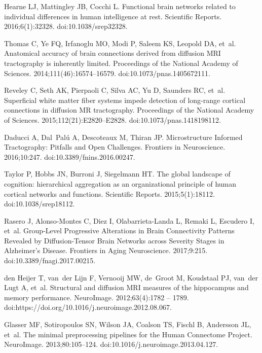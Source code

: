 \documentclass[10pt,letterpaper]{article}
\begin{document}
\begin{thebibliography}{10}
Hearne LJ, Mattingley JB, Cocchi L.
\newblock Functional brain networks related to individual differences in human
  intelligence at rest.
\newblock Scientific Reports. 2016;6(1):32328.
\newblock doi:{10.1038/srep32328}.

Thomas C, Ye FQ, Irfanoglu MO, Modi P, Saleem KS, Leopold DA, et~al.
\newblock Anatomical accuracy of brain connections derived from diffusion MRI
  tractography is inherently limited.
\newblock Proceedings of the National Academy of Sciences.
  2014;111(46):16574--16579.
\newblock doi:{10.1073/pnas.1405672111}.

Reveley C, Seth AK, Pierpaoli C, Silva AC, Yu D, Saunders RC, et~al.
\newblock Superficial white matter fiber systems impede detection of long-range
  cortical connections in diffusion MR tractography.
\newblock Proceedings of the National Academy of Sciences.
  2015;112(21):E2820--E2828.
\newblock doi:{10.1073/pnas.1418198112}.

Daducci A, Dal~Palú A, Descoteaux M, Thiran JP.
\newblock Microstructure Informed Tractography: Pitfalls and Open Challenges.
\newblock Frontiers in Neuroscience. 2016;10:247.
\newblock doi:{10.3389/fnins.2016.00247}.

Taylor P, Hobbs JN, Burroni J, Siegelmann HT.
\newblock The global landscape of cognition: hierarchical aggregation as an
  organizational principle of human cortical networks and functions.
\newblock Scientific Reports. 2015;5(1):18112.
\newblock doi:{10.1038/srep18112}.

Rasero J, Alonso-Montes C, Diez I, Olabarrieta-Landa L, Remaki L, Escudero I,
  et~al.
\newblock Group-Level Progressive Alterations in Brain Connectivity Patterns
  Revealed by Diffusion-Tensor Brain Networks across Severity Stages in
  Alzheimer’s Disease.
\newblock Frontiers in Aging Neuroscience. 2017;9:215.
\newblock doi:{10.3389/fnagi.2017.00215}.

den Heijer T, van~der Lijn F, Vernooij MW, de~Groot M, Koudstaal PJ, van~der
  Lugt A, et~al.
\newblock Structural and diffusion MRI measures of the hippocampus and memory
  performance.
\newblock NeuroImage. 2012;63(4):1782 -- 1789.
\newblock doi:{https://doi.org/10.1016/j.neuroimage.2012.08.067}.

Glasser MF, Sotiropoulos SN, Wilson JA, Coalson TS, Fischl B, Andersson JL,
  et~al.
\newblock The minimal preprocessing pipelines for the {Human} {Connectome}
  {Project}.
\newblock NeuroImage. 2013;80:105--124.
\newblock doi:{10.1016/j.neuroimage.2013.04.127}.


\end{thebibliography}
\end{document}
